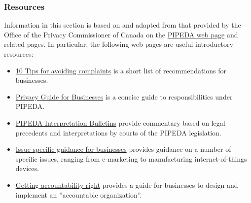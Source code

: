 \begin{tcolorbox}[colback=alert]
\subsubsection*{Resources}
Information in this section is based on and adapted from that provided by the Office of the Privacy Commissioner of Canada on the \href{https://www.priv.gc.ca/en/privacy-topics/privacy-laws-in-canada/the-personal-information-protection-and-electronic-documents-act-pipeda/p_principle/}{PIPEDA web page} and related pages. In particular, the following web pages are useful introductory resources:
\begin{itemize}
   \item \href{https://www.priv.gc.ca/en/privacy-topics/privacy-laws-in-canada/the-personal-information-protection-and-electronic-documents-act-pipeda/pipeda-compliance-help/02_05_d_55_tips/}{10 Tips for avoiding complaints} is a short list of recommendations for businesses. 
   \item \href{https://www.priv.gc.ca/media/2038/guide_org_e.pdf}{Privacy Guide for Businesses} is a concise guide to responsibilities under PIPEDA.
   \item \href{https://www.priv.gc.ca/en/privacy-topics/privacy-laws-in-canada/the-personal-information-protection-and-electronic-documents-act-pipeda/pipeda-compliance-help/pipeda-interpretation-bulletins/}{PIPEDA Interpretation Bulletins} provide commentary based on legal precedents and interpretations by courts of the PIPEDA legislation.
   \item \href{https://www.priv.gc.ca/en/privacy-topics/privacy-laws-in-canada/the-personal-information-protection-and-electronic-documents-act-pipeda/pipeda-compliance-help/issue-specific-guidance-for-businesses/}{Issue specific guidance for businesses} provides guidance on a number of specific issues, ranging from e-marketing to manufacturing internet-of-things devices.
   \item \href{https://www.priv.gc.ca/en/privacy-topics/privacy-laws-in-canada/the-personal-information-protection-and-electronic-documents-act-pipeda/pipeda-compliance-help/pipeda-compliance-and-training-tools/gl_acc_201204/}{Getting accountability right} provides a guide for businesses to design and implement an ''accountable organization''. 
\end{itemize}
\end{tcolorbox}

